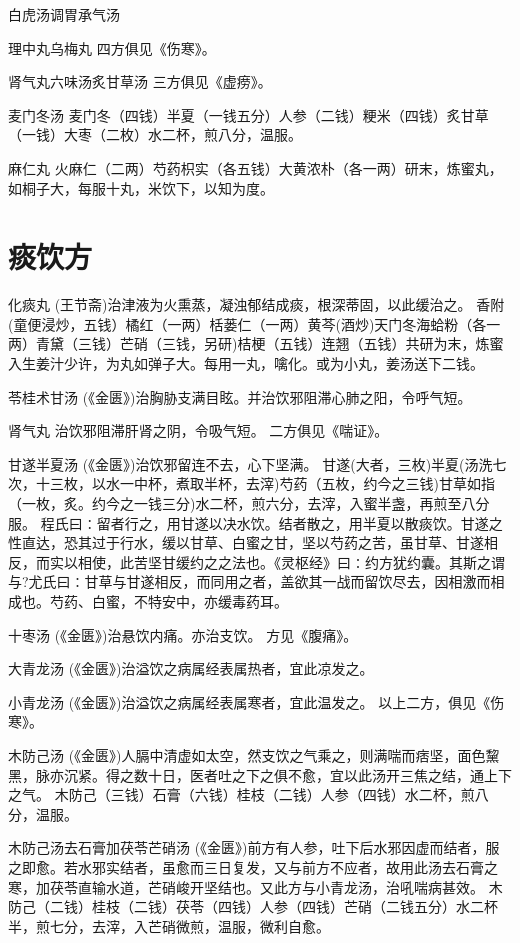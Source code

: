\documentclass[a4paper,12pt,UTF8,twoside]{ctexbook}
\begin{document}
	白虎汤调胃承气汤
	
	理中丸乌梅丸
	四方俱见《伤寒》。
	
	肾气丸六味汤炙甘草汤
	三方俱见《虚痨》。
	
	麦门冬汤
	麦门冬（四钱）半夏（一钱五分）人参（二钱）粳米（四钱）炙甘草（一钱）大枣（二枚）水二杯，煎八分，温服。
	
	麻仁丸
	火麻仁（二两）芍药枳实（各五钱）大黄浓朴（各一两）研末，炼蜜丸，如桐子大，每服十丸，米饮下，以知为度。
	
	\chapter{痰饮方}	
	
	化痰丸
	(王节斋)治津液为火熏蒸，凝浊郁结成痰，根深蒂固，以此缓治之。
	香附(童便浸炒，五钱）橘红（一两）栝蒌仁（一两）黄芩(酒炒)天门冬海蛤粉（各一两）青黛（三钱）芒硝（三钱，另研)桔梗（五钱）连翘（五钱）共研为末，炼蜜入生姜汁少许，为丸如弹子大。每用一丸，噙化。或为小丸，姜汤送下二钱。
	
	苓桂术甘汤
	(《金匮》)治胸胁支满目眩。并治饮邪阻滞心肺之阳，令呼气短。
	
	肾气丸
	治饮邪阻滞肝肾之阴，令吸气短。
	二方俱见《喘证》。
	
	甘遂半夏汤
	(《金匮》)治饮邪留连不去，心下坚满。
	甘遂(大者，三枚)半夏(汤洗七次，十三枚，以水一中杯，煮取半杯，去滓)芍药（五枚，约今之三钱)甘草如指（一枚，炙。约今之一钱三分)水二杯，煎六分，去滓，入蜜半盏，再煎至八分服。
	程氏曰∶留者行之，用甘遂以决水饮。结者散之，用半夏以散痰饮。甘遂之性直达，恐其过于行水，缓以甘草、白蜜之甘，坚以芍药之苦，虽甘草、甘遂相反，而实以相使，此苦坚甘缓约之之法也。《灵枢经》曰∶约方犹约囊。其斯之谓与?尤氏曰∶甘草与甘遂相反，而同用之者，盖欲其一战而留饮尽去，因相激而相成也。芍药、白蜜，不特安中，亦缓毒药耳。
	
	十枣汤
	(《金匮》)治悬饮内痛。亦治支饮。
	方见《腹痛》。
	
	大青龙汤
	(《金匮》)治溢饮之病属经表属热者，宜此凉发之。
	
	小青龙汤
	(《金匮》)治溢饮之病属经表属寒者，宜此温发之。
	以上二方，俱见《伤寒》。
	
	木防己汤
	(《金匮》)人膈中清虚如太空，然支饮之气乘之，则满喘而痞坚，面色黧黑，脉亦沉紧。得之数十日，医者吐之下之俱不愈，宜以此汤开三焦之结，通上下之气。
	木防己（三钱）石膏（六钱）桂枝（二钱）人参（四钱）水二杯，煎八分，温服。
	
	木防己汤去石膏加茯苓芒硝汤
	(《金匮》)前方有人参，吐下后水邪因虚而结者，服之即愈。若水邪实结者，虽愈而三日复发，又与前方不应者，故用此汤去石膏之寒，加茯苓直输水道，芒硝峻开坚结也。又此方与小青龙汤，治吼喘病甚效。
	木防己（二钱）桂枝（二钱）茯苓（四钱）人参（四钱）芒硝（二钱五分）水二杯半，煎七分，去滓，入芒硝微煎，温服，微利自愈。
	
\end{document}
